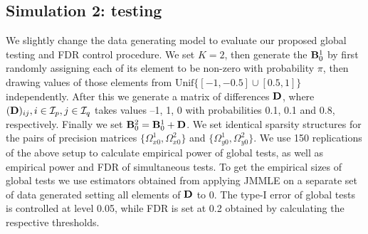 \subsection{Simulation 2: testing}
\label{sec:eval-testing}
We slightly change the data generating model to evaluate our proposed global testing and FDR control procedure. We set $K=2$, then generate the ${\mathbf{B}}_0^1$ by first randomly assigning each of its element to be non-zero with probability $\pi$, then drawing values of those elements from $\text{Unif}\{ [ -1, -0.5] \cup [0.5,1]\}$ independently. After this we generate a matrix of differences ${\mathbf{D}}$, where $({\mathbf{D}})_{ij}, i \in {\cal{I}}_p, j \in {\cal{I}}_q$ takes values --1, 1, 0 with probabilities 0.1, 0.1 and 0.8, respectively. Finally we set ${\mathbf{B}}_0^2 = {\mathbf{B}}_0^1 + {\mathbf{D}}$. We set identical sparsity structures for the pairs of precision matrices $\{ \Omega_{x0}^1, \Omega_{x0}^2 \}$ and $\{ \Omega_{y0}^1, \Omega_{y0}^2 \}$. We use 150 replications of the above setup to calculate empirical power of global tests, as well as empirical power and FDR of simultaneous tests. To get the empirical sizes of global tests we use estimators obtained from applying JMMLE on a separate set of data generated setting all elements of ${\mathbf{D}}$ to 0. The type-I error of global tests is controlled at level 0.05, while FDR is set at 0.2 obtained by calculating the respective thresholds.

